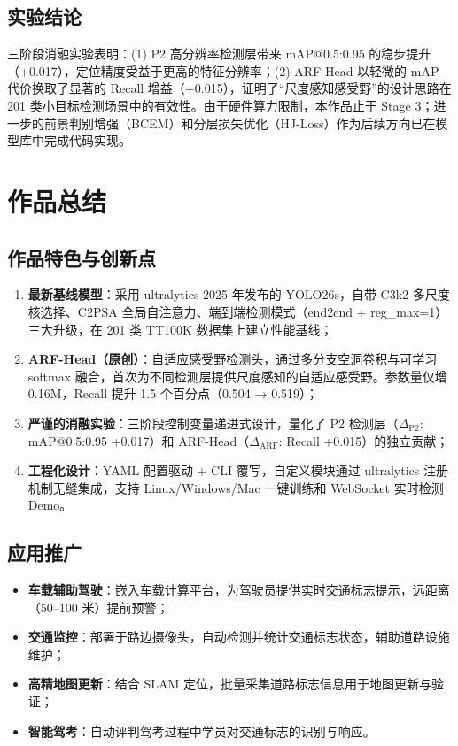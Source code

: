 \documentclass[12pt,a4paper,linespread=1.5,fontset=none]{ctexart}
\begin{document}
\subsection{实验结论}

三阶段消融实验表明：(1) P2 高分辨率检测层带来 mAP@0.5:0.95 的稳步提升（+0.017），定位精度受益于更高的特征分辨率；(2) ARF-Head 以轻微的 mAP 代价换取了显著的 Recall 增益（+0.015），证明了``尺度感知感受野''的设计思路在 201 类小目标检测场景中的有效性。由于硬件算力限制，本作品止于 Stage 3；进一步的前景判别增强（BCEM）和分层损失优化（HJ-Loss）作为后续方向已在模型库中完成代码实现。

\section{作品总结}

\subsection{作品特色与创新点}

\begin{enumerate}[label=(\arabic*)]
    \item \textbf{最新基线模型}：采用 ultralytics 2025 年发布的 YOLO26s，自带 C3k2 多尺度核选择、C2PSA 全局自注意力、端到端检测模式（end2end + reg\_max=1）三大升级，在 201 类 TT100K 数据集上建立性能基线；
    \item \textbf{ARF-Head（原创）}：自适应感受野检测头，通过多分支空洞卷积与可学习 softmax 融合，首次为不同检测层提供尺度感知的自适应感受野。参数量仅增 0.16M，Recall 提升 1.5 个百分点（0.504 → 0.519）；
    \item \textbf{严谨的消融实验}：三阶段控制变量递进式设计，量化了 P2 检测层（$\Delta_{\text{P2}}$: mAP@0.5:0.95 +0.017）和 ARF-Head（$\Delta_{\text{ARF}}$: Recall +0.015）的独立贡献；
    \item \textbf{工程化设计}：YAML 配置驱动 + CLI 覆写，自定义模块通过 ultralytics 注册机制无缝集成，支持 Linux/Windows/Mac 一键训练和 WebSocket 实时检测 Demo。
\end{enumerate}

\subsection{应用推广}

\begin{itemize}
    \item \textbf{车载辅助驾驶}：嵌入车载计算平台，为驾驶员提供实时交通标志提示，远距离（50--100 米）提前预警；
    \item \textbf{交通监控}：部署于路边摄像头，自动检测并统计交通标志状态，辅助道路设施维护；
    \item \textbf{高精地图更新}：结合 SLAM 定位，批量采集道路标志信息用于地图更新与验证；
    \item \textbf{智能驾考}：自动评判驾考过程中学员对交通标志的识别与响应。
\end{itemize}
\end{document}
